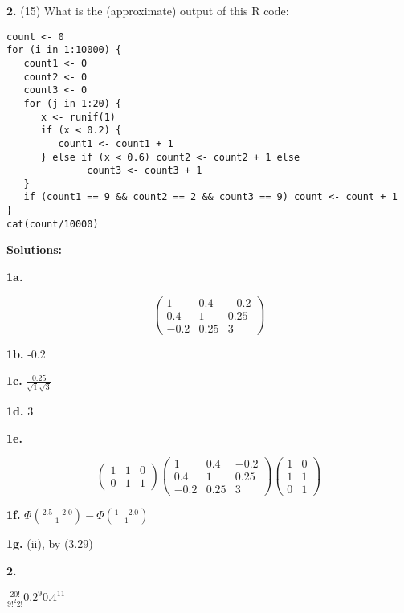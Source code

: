\documentclass[twocolumn]{article}
\begin{document}
{\bf 2.} (15) What is the (approximate) output of this R code:

\begin{Verbatim}[fontsize=\relsize{-2}]
count <- 0
for (i in 1:10000) {
   count1 <- 0
   count2 <- 0
   count3 <- 0
   for (j in 1:20) {
      x <- runif(1)
      if (x < 0.2) {
         count1 <- count1 + 1 
      } else if (x < 0.6) count2 <- count2 + 1 else 
              count3 <- count3 + 1
   }
   if (count1 == 9 && count2 == 2 && count3 == 9) count <- count + 1
}
cat(count/10000)
\end{Verbatim}

{\bf Solutions:}

{\bf 1a.}

\begin{equation}
   \left (
   \begin{array}{ccc}
   1 & 0.4 & -0.2\\
   0.4  & 1 &  0.25 \\
   -0.2  & 0.25  & 3
   \end{array}
   \right )     
\end{equation}

{\bf 1b.} -0.2

{\bf 1c.} $ \frac {0.25} {\sqrt{1} \sqrt{3}} $

{\bf 1d.} 3

{\bf 1e.}

$$
   \left (
   \begin{array}{ccc}
   1 & 1 & 0 \\
   0 & 1 & 1 
   \end{array}
   \right )     
   \left (
   \begin{array}{ccc}
   1 & 0.4 & -0.2\\
   0.4  & 1 &  0.25 \\
   -0.2  & 0.25  & 3
   \end{array}
   \right )     
   \left (
   \begin{array}{cc}
   1 & 0 \\
   1 & 1 \\
   0 & 1 
   \end{array}
   \right )     
$$

{\bf 1f.} $
\Phi(\frac{2.5-2.0}{1}) - 
\Phi(\frac{1-2.0}{1}) 
$

{\bf 1g.} (ii), by (3.29)

{\bf 2.}

$
\frac{20!}{9!^2 2!}
0.2^9 0.4^{11} 
$
\end{document}
